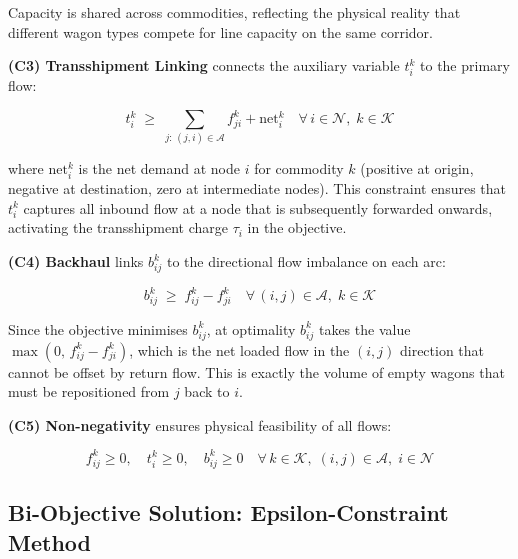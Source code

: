 \documentclass[11pt, a4paper]{article}
\numberwithin{equation}{section}
\numberwithin{figure}{section}
\numberwithin{table}{section}
\begin{document}
Capacity is shared across commodities, reflecting the physical reality that different
wagon types compete for line capacity on the same corridor. 

\textbf{(C3) Transshipment Linking} connects the auxiliary variable $t^k_i$ to the
primary flow:

\begin{equation}
    t^k_i \;\geq\;
    \sum_{j:\,(j,i)\in\mathcal{A}} f^k_{ji} + \text{net}^k_i
    \quad \forall\, i \in \mathcal{N},\; k \in \mathcal{K}
    \label{eq:transship}
\end{equation}

where $\text{net}^k_i$ is the net demand at node $i$ for commodity $k$ (positive at
origin, negative at destination, zero at intermediate nodes). This constraint ensures
that $t^k_i$ captures all inbound flow at a node that is subsequently forwarded
onwards, activating the transshipment charge $\tau_i$ in the objective.

\textbf{(C4) Backhaul} links $b^k_{ij}$ to the directional flow imbalance on each arc:

\begin{equation}
    b^k_{ij} \;\geq\; f^k_{ij} - f^k_{ji}
    \quad \forall\, (i,j) \in \mathcal{A},\; k \in \mathcal{K}
    \label{eq:backhaul}
\end{equation}

Since the objective minimises $b^k_{ij}$, at optimality $b^k_{ij}$ takes the value
$\max(0,\, f^k_{ij} - f^k_{ji})$, which is the net loaded flow in the $(i,j)$
direction that cannot be offset by return flow. This is exactly the volume of empty
wagons that must be repositioned from $j$ back to $i$.

\textbf{(C5) Non-negativity} ensures physical feasibility of all flows:

\begin{equation}
    f^k_{ij} \geq 0, \quad t^k_i \geq 0, \quad b^k_{ij} \geq 0
    \quad \forall\, k \in \mathcal{K},\; (i,j) \in \mathcal{A},\; i \in \mathcal{N}
    \label{eq:nonneg}
\end{equation}

\subsection{Bi-Objective Solution: Epsilon-Constraint Method}
\label{subsec:epsilon}
\end{document}
